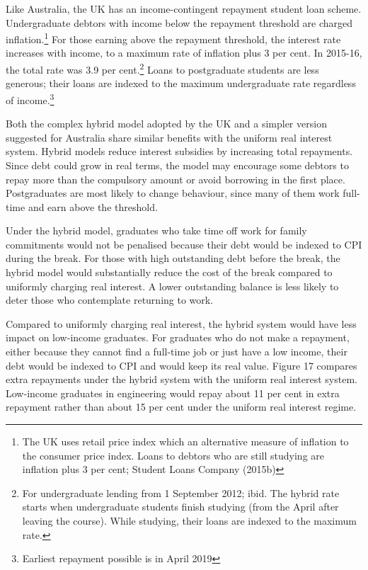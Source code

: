 \documentclass[]{book}
\begin{document}
Like Australia, the UK has an income-contingent repayment student loan scheme. Undergraduate debtors with income below the repayment threshold are charged inflation.\footnote{The UK uses retail price index which an alternative measure of inflation to the consumer price index. Loans to debtors who are still studying are inflation plus 3 per cent; Student Loans Company (2015b)} For those earning above the repayment threshold, the interest rate increases with income, to a maximum rate of inflation plus 3 per cent. In 2015-16, the total rate was 3.9 per cent.\footnote{For undergraduate lending from 1 September 2012; ibid. The hybrid rate starts when undergraduate students finish studying (from the April after leaving the course). While studying, their loans are indexed to the maximum rate.} Loans to postgraduate students are less generous; their loans are indexed to the maximum undergraduate rate regardless of income.\footnote{Earliest repayment possible is in April 2019}

Both the complex hybrid model adopted by the UK and a simpler version suggested for Australia share similar benefits with the uniform real interest system. Hybrid models reduce interest subsidies by increasing total repayments. Since debt could grow in real terms, the model may encourage some debtors to repay more than the compulsory amount or avoid borrowing in the first place. Postgraduates are most likely to change behaviour, since many of them work full-time and earn above the threshold.

Under the hybrid model, graduates who take time off work for family commitments would not be penalised because their debt would be indexed to CPI during the break. For those with high outstanding debt before the break, the hybrid model would substantially reduce the cost of the break compared to uniformly charging real interest. A lower outstanding balance is less likely to deter those who contemplate returning to work.

Compared to uniformly charging real interest, the hybrid system would have less impact on low-income graduates. For graduates who do not make a repayment, either because they cannot find a full-time job or just have a low income, their debt would be indexed to CPI and would keep its real value. Figure 17 compares extra repayments under the hybrid system with the uniform real interest system. Low-income graduates in engineering would repay about 11 per cent in extra repayment rather than about 15 per cent under the uniform real interest regime.
\end{document}
